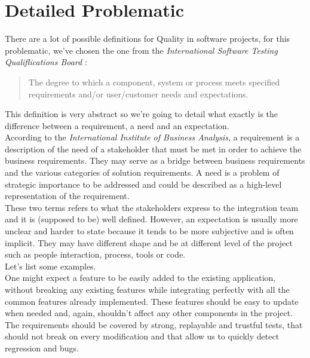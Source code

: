 \section{Detailed Problematic}\label{sec:detailed-problematic}
There are a lot of possible definitions for Quality in software projects, for
this problematic, we've chosen the one from the \textit{International Software
Testing Qualiflications Board} :
\begin{quote}
The degree to which a component, system or process meets specified
requirements and/or user/customer needs and expectations.
\end{quote}
This definition is very abstract so we're going to detail what exactly is the
difference between a requirement, a need and an expectation. \\
According to the \textit{International Institute of Business Analysis}, a
requirement is a description of the need of a stakeholder that must be met in
order to achieve the business requirements.
They may serve as a bridge between business requirements and the various
categories of solution requirements.
A need is a problem of strategic importance to be addressed and could be
described as a high-level representation of the requirement. \\
These two terms refers to what the stakeholders express to the integration
team and it is (supposed to be) well defined.
However, an expectation is usually more unclear and harder to state because
it tends to be more subjective and is often implicit.
They may have different shape and be at different level of the project such as
people interaction, process, tools or code. \\
\newline
Let's list some examples. \\
One might expect a feature to be easily added to the existing application,
without breaking any existing features while integrating perfectly with all the
common features already implemented.
These features should be easy to update when needed and, again, shouldn't
affect any other components in the project.
The requirements should be covered by strong, replayable and trustful tests,
that should not break on every modification and that allow us to quickly
detect regression and bugs. \\

